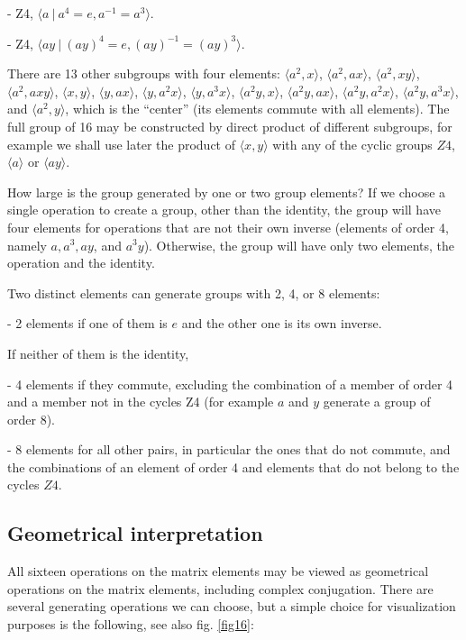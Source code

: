 {- Z4, $\langle a \ | \ a^{4}=e, a^{-1}=a^{3}\rangle$.

- Z4, $\langle ay \ | \ (ay)^{4}=e, (ay)^{-1}=(ay)^{3}\rangle$.

There are 13 other subgroups with four elements: $\langle a^{2}, x\rangle$, $\langle a^{2}, ax\rangle$, $\langle a^{2}, xy\rangle$, $\langle a^{2}, axy\rangle$, $\langle x, y\rangle$, $\langle y, ax\rangle$, $\langle y, a^{2}x\rangle$, $\langle y, a^{3}x\rangle$, $\langle a^{2}y, x\rangle$, $ \langle a^{2}y, ax\rangle$, $\langle a^{2}y, a^{2}x\rangle$, $\langle a^{2}y, a^{3}x\rangle$, and $\langle a^{2}, y\rangle$, which is the ``center'' (its elements commute with all elements).
The full group of 16 may be constructed by direct product of different subgroups, for example
we shall use later the product of $\langle x,y\rangle$ with any of the cyclic groups $Z4$,
$\langle a\rangle$ or $\langle ay\rangle$.



How large is the group generated by one or two group elements?
If we choose a single operation to create a group, other than the identity, the group will have four elements for operations that are not their own inverse (elements of order 4, namely  $a, a^{3}, ay$, and $a^{3}y$). Otherwise, the group will have only two elements, the operation and the identity.

Two distinct elements can generate groups with  2, 4, or  8 elements:

- 2 elements if one of them is $e$ and the other one is its own inverse.

If neither of them is the identity,

- 4 elements if they commute, excluding the combination of a member of order 4 and a member not in the cycles Z4
(for example $a$ and $y$ generate a group of order 8).

- 8 elements for all other pairs,  in particular the ones that do not commute, and the combinations of an element of order
4 and elements that do not belong to the cycles $Z4$.
%
%
%
\subsection{Geometrical interpretation\label{gi}}
%
%
All sixteen operations on the matrix elements may be viewed as geometrical operations on the
matrix elements, including complex conjugation.
There are several generating operations we can choose, but a simple choice for visualization  purposes is the following, see also fig. \ref{fig16}:

}

